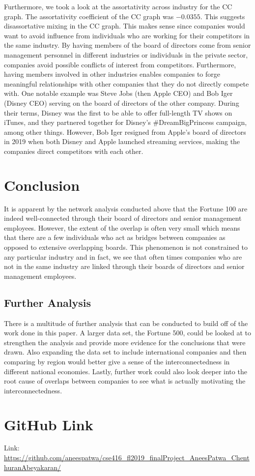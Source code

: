 \documentclass[a4paper]{article}
\begin{document}
Furthermore, we took a look at the assortativity across industry for the CC graph. The assortativity coefficient of the CC graph was $-0.0355$. This suggests disassortative mixing in the CC graph. This makes sense since companies would want to avoid influence from individuals who are working for their competitors in the same industry. By having members of the board of directors come from senior management personnel in different industries or individuals in the private sector, companies avoid possible conflicts of interest from competitors. Furthermore, having members involved in other industries enables companies to forge meaningful relationships with other companies that they do not directly compete with. One notable example was Steve Jobs (then Apple CEO) and Bob Iger (Disney CEO) serving on the board of directors of the other company. During their terms, Disney was the first to be able to offer full-length TV shows on iTunes, and they partnered together for Disney's \#DreamBigPrincess campaign, among other things. However, Bob Iger resigned from Apple's board of directors in 2019 when both Disney and Apple launched streaming services, making the companies direct competitors with each other. 

\newpage
\section*{Conclusion}
It is apparent by the network analysis conducted above that the Fortune 100 are indeed well-connected through their board of directors and senior management employees. However, the extent of the overlap is often very small which means that there are a few individuals who act as bridges between companies as opposed to extensive overlapping boards. This phenomenon is not constrained to any particular industry and in fact, we see that often times companies who are not in the same industry are linked through their boards of directors and senior management employees.
    \subsection*{Further Analysis}
    There is a multitude of further analysis that can be conducted to build off of the work done in this paper. A larger data set, the Fortune 500, could be looked at to strengthen the analysis and provide more evidence for the conclusions that were drawn. Also expanding the data set to include international companies and then comparing by region would better give a sense of the interconnectedness in different national economies. Lastly, further work could also look deeper into the root cause of overlaps between companies to see what is actually motivating the interconnectedness.

\section*{GitHub Link}
Link: \url{https://github.com/aneespatwa/cse416_fl2019_finalProject_AneesPatwa_ChenthuranAbeyakaran/}

\nocite{*}


\end{document}
